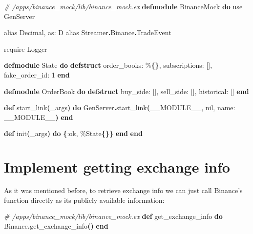 \documentclass[
  oneside]{book}
\newenvironment{Shaded}{\begin{snugshade}}{\end{snugshade}}
\newcommand{\CommentTok}[1]{\textcolor[rgb]{0.56,0.35,0.01}{\textit{#1}}}
\newcommand{\ConstantTok}[1]{\textcolor[rgb]{0.56,0.35,0.01}{#1}}
\newcommand{\DecValTok}[1]{\textcolor[rgb]{0.00,0.00,0.81}{#1}}
\newcommand{\FunctionTok}[1]{\textcolor[rgb]{0.13,0.29,0.53}{\textbf{#1}}}
\newcommand{\ImportTok}[1]{#1}
\newcommand{\KeywordTok}[1]{\textcolor[rgb]{0.13,0.29,0.53}{\textbf{#1}}}
\newcommand{\NormalTok}[1]{#1}
\newcommand{\OperatorTok}[1]{\textcolor[rgb]{0.81,0.36,0.00}{\textbf{#1}}}
\newcommand{\OtherTok}[1]{\textcolor[rgb]{0.56,0.35,0.01}{#1}}
\newcommand{\VariableTok}[1]{\textcolor[rgb]{0.00,0.00,0.00}{#1}}
\begin{document}
\begin{Shaded}
\begin{Highlighting}[]
\CommentTok{\# /apps/binance\_mock/lib/binance\_mock.ex}
\KeywordTok{defmodule} \ConstantTok{BinanceMock} \KeywordTok{do}
  \ImportTok{use} \ConstantTok{GenServer}

  \ImportTok{alias} \ConstantTok{Decimal}\NormalTok{, }\VariableTok{as:}\NormalTok{ D}
  \ImportTok{alias} \ConstantTok{Streamer}\OperatorTok{.}\ConstantTok{Binance}\OperatorTok{.}\ConstantTok{TradeEvent}

  \ImportTok{require} \ConstantTok{Logger}

  \KeywordTok{defmodule} \ConstantTok{State} \KeywordTok{do}
    \KeywordTok{defstruct} \VariableTok{order\_books:}\NormalTok{ \%}\FunctionTok{\{\}}\NormalTok{, }\VariableTok{subscriptions:} \OtherTok{[]}\NormalTok{, }\VariableTok{fake\_order\_id:} \DecValTok{1}
  \KeywordTok{end}

  \KeywordTok{defmodule} \ConstantTok{OrderBook} \KeywordTok{do}
    \KeywordTok{defstruct} \VariableTok{buy\_side:} \OtherTok{[]}\NormalTok{, }\VariableTok{sell\_side:} \OtherTok{[]}\NormalTok{, }\VariableTok{historical:} \OtherTok{[]}
  \KeywordTok{end}  

  \KeywordTok{def}\NormalTok{ start\_link}\FunctionTok{(}\NormalTok{\_args}\FunctionTok{)} \KeywordTok{do}
    \ConstantTok{GenServer}\OperatorTok{.}\NormalTok{start\_link}\FunctionTok{(}\ConstantTok{\_\_MODULE\_\_}\NormalTok{, }\ConstantTok{nil}\NormalTok{, }\VariableTok{name:} \ConstantTok{\_\_MODULE\_\_}\FunctionTok{)}
  \KeywordTok{end}

  \KeywordTok{def}\NormalTok{ init}\FunctionTok{(}\NormalTok{\_args}\FunctionTok{)} \KeywordTok{do}
    \FunctionTok{\{}\VariableTok{:ok}\NormalTok{, \%}\ConstantTok{State}\FunctionTok{\{\}\}}
  \KeywordTok{end}
\KeywordTok{end}
\end{Highlighting}
\end{Shaded}

\section{Implement getting exchange info}\label{implement-getting-exchange-info}

As it was mentioned before, to retrieve exchange info we can just call Binance's function directly as its publicly available information:

\begin{Shaded}
\begin{Highlighting}[]
\CommentTok{\# /apps/binance\_mock/lib/binance\_mock.ex}
  \KeywordTok{def}\NormalTok{ get\_exchange\_info }\KeywordTok{do}
    \ConstantTok{Binance}\OperatorTok{.}\NormalTok{get\_exchange\_info}\FunctionTok{()}
  \KeywordTok{end}
\end{Highlighting}
\end{Shaded}
\end{document}
